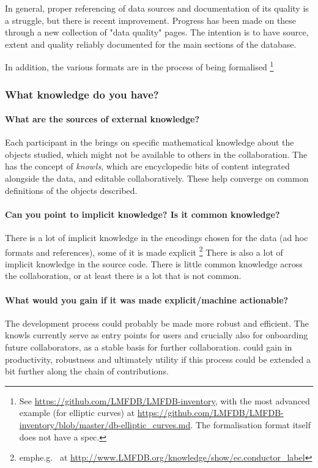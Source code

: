 In general, proper referencing of data sources and documentation of its quality is a struggle, but there is recent improvement. 
Progress has been made on these through a new collection of "data quality" pages. The intention is to have source, extent and quality reliably documented for the main sections of the database.

In addition, the various formats are in the process of being formalised \footnote{See \url{https://github.com/LMFDB/LMFDB-inventory}, with the most advanced example (for elliptic curves) at \url{https://github.com/LMFDB/LMFDB-inventory/blob/master/db-elliptic_curves.md}. The formalisation format itself does not have a spec.}



\subsubsection{What knowledge do you have?}
\paragraph{What are the sources of external knowledge?}
Each participant in the \LMFDB brings on specific mathematical knowledge about the objects studied, which might not be available to others in the collaboration. The \LMFDB has the concept of \emph{knowls}, which are encyclopedic bits of content integrated alongside the data, and editable collaboratively. These help converge on common definitions of the objects described. 

\paragraph{Can you point to implicit knowledge? Is it common knowledge?}
There is a lot of implicit knowledge in the encodings chosen for the data (ad hoc formats and references), some of it is made explicit \footnote{emph{e.g.}~ at \url{http://www.LMFDB.org/knowledge/show/ec.conductor_label}}
There is also a lot of implicit knowledge in the source code. There is little common knowledge across the collaboration, or at least there is a lot that is not common.

\paragraph{What would you gain if it was made explicit/machine actionable?}
The development process could probably be made more robust and efficient. The knowls currently serve as entry points for users and crucially also for onboarding future collaborators, as a stable basis for further collaboration. \LMFDB could gain in productivity, robustness and ultimately utility if this process could be extended a bit further along the chain of contributions.

